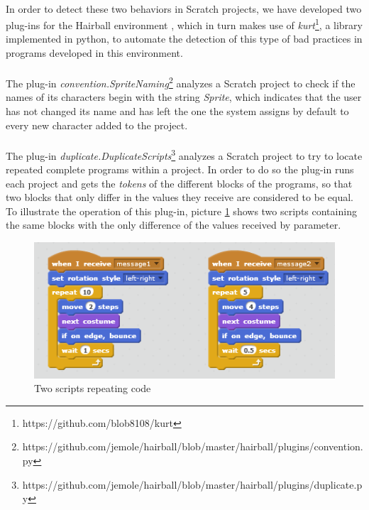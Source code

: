 \documentclass[a4paper,10pt]{article}
\begin{document}
\paragraph{}In order to detect these two behaviors in Scratch projects, we have developed two plug-ins for the Hairball environment \cite{boe2013hairball}, which in turn makes use of \textit{kurt}\footnote{https://github.com/blob8108/kurt}, a library implemented in python, to automate the detection of this type of bad practices in programs developed in this environment.
\paragraph{}The plug-in \textit{convention.SpriteNaming}\footnote{https://github.com/jemole/hairball/blob/master/hairball/plugins/convention.py} analyzes a Scratch project to check if the names of its characters begin with the string \textit{Sprite}, which indicates that the user has not changed its name and has left the one the system assigns by default to every new character added to the project.
\paragraph{}The plug-in \textit{duplicate.DuplicateScripts}\footnote{https://github.com/jemole/hairball/blob/master/hairball/plugins/duplicate.py} analyzes a Scratch project to try to locate repeated complete programs within a project. In order to do so the plug-in runs each project and gets the \textit{tokens} of the different blocks of the programs, so that two blocks that only differ in the values they receive are considered to be equal. To illustrate the operation of this plug-in, picture \ref{fig:CodeRepetition1} shows two scripts containing the same blocks with the only difference of the values received by parameter.
\begin{figure}
  \centering
    \includegraphics{img/CodeRepetition1.png}
  \caption{Two scripts repeating code}
  \label{fig:CodeRepetition1}
\end{figure}
\end{document}

